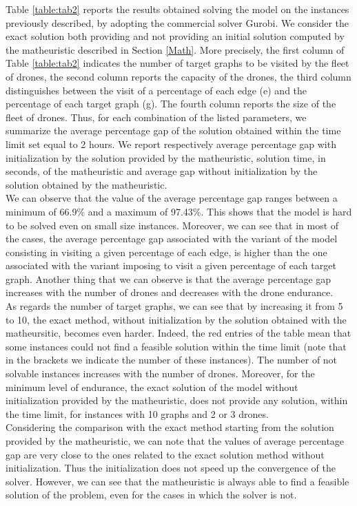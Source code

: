 \noindent
Table \ref{table:tab2} reports the results obtained solving the \AMD model on the instances previously described, by adopting the commercial solver Gurobi. We consider the exact solution both providing and not providing an initial solution computed by the matheuristic described in Section \ref{Math}. More precisely, the first column of Table \ref{table:tab2} indicates the number of target graphs to be visited by the fleet of drones, the second column reports the capacity of the drones, the third column distinguishes between the visit of a percentage of each edge (e) and the percentage of each target graph (g). The fourth column reports the size of the fleet of drones. Thus, for each combination of the listed parameters, we summarize the average percentage gap of the solution obtained within the time limit set equal to 2 hours. We report respectively average percentage gap with initialization by the solution provided by the matheuristic, solution time, in seconds, of the matheuristic and average gap without initialization by the solution obtained by the matheuristic.\\
We can observe that the value of the average percentage gap ranges between a minimum of 66.9\% and a maximum of 97.43\%. This shows that the model is hard to be solved even on small size instances. Moreover, we can see that in most of the cases, the average percentage gap associated with the variant of the model consisting in visiting a given percentage of each edge, is higher than the one associated with the variant imposing to visit a given percentage of each target graph. Another thing that we can observe is that the average percentage gap increases with the number of drones and decreases with the drone endurance.\\
As regards the number of target graphs, we can see that by increasing it from 5 to 10, the exact method, without initialization by the solution obtained with the matheursitic, becomes even harder. Indeed, the red entries of the table mean that some instances could not find a feasible solution within the time limit (note that in the brackets we indicate the number of these instances). The number of not solvable instances increases with the number of drones. Moreover, for the minimum level of endurance, the exact solution of the model without initialization provided by the matheuristic, does not provide any solution, within the time limit, for instances with 10 graphs and 2 or 3 drones.\\
Considering the comparison with the exact method starting from the solution provided by the matheuristic, we can note that the values of average percentage gap are very close to the ones related to the exact solution method without initialization. Thus the initialization does not speed up the convergence of the solver. However, we can see that the matheuristic is always able to find a feasible solution of the problem, even for the cases in which the solver is not.\\
